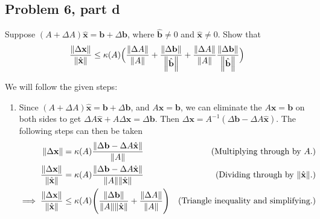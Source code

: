 \subsection{Problem 6, part d}
Suppose $(A + \Delta A) \hat{\textbf{x}} = \textbf{b} + \Delta \textbf{b}$, where $\hat{\textbf{b}} \neq 0$ and $\hat{\textbf{x}} \neq 0$. Show that 
\[
\frac{\norm{\Delta \textbf{x}}}{\norm{\hat{\textbf{x}}}} \leq \kappa(A)\Big( \frac{\norm{\Delta A}}{\norm{A}} + \frac{\norm{\Delta \textbf{b}}}{\norm{\hat{\textbf{b}}}} + \frac{\norm{\Delta A}}{\norm{A}}\frac{\norm{\Delta \textbf{b}}}{\norm{\hat{\textbf{b}}}}\Big)
\]
\partbreak
\begin{solution}

We will follow the given steps:
\begin{enumerate}
    \item Since  $(A + \Delta A) \hat{\textbf{x}} = \textbf{b} + \Delta \textbf{b}$, and $A\textbf{x} = \textbf{b}$, we can eliminate the $A\textbf{x} = \textbf{b}$ on both sides to get $\Delta A \hat{\textbf{x}} + A\Delta \textbf{x} = \Delta \textbf{b}$. Then $\Delta \textbf{x} = A^{-1}(\Delta \textbf{b} - \Delta A \hat{\textbf{x}})$. The following steps can then be taken
    \alignbreak
    \begin{align}
        \norm{\Delta \textbf{x}} &= \kappa(A)\frac{\norm{\Delta \textbf{b} - \Delta A \hat{\textbf{x}}}}{\norm{A}} &\text{(Multiplying through by $A$.)}\nonumber\\
        \frac{\norm{\Delta \textbf{x}}}{\norm{\hat{\textbf{x}}}} &= \kappa(A)\frac{\norm{\Delta \textbf{b} - \Delta A \hat{\textbf{x}}}}{\norm{A}\norm{\hat{\textbf{x}}}} &\text{(Dividing through by $\norm{\hat{\textbf{x}}}.)$}\nonumber\\
        \implies \frac{\norm{\Delta \textbf{x}}}{\norm{\hat{\textbf{x}}}} &\leq \kappa(A)\Bigg( \frac{\norm{\Delta \textbf{b}}}{\norm{A}\norm{\hat{\textbf{x}}}} + \frac{\norm{\Delta A}}{\norm{A}} \Bigg) &\text{(Triangle inequality and simplifying.)}\label{p6d:plug}
    \end{align}
    \alignbreak


\end{enumerate}
\end{solution}
